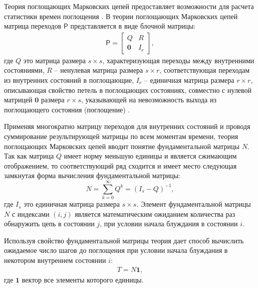 Теория поглощающих Марковских цепей предоставляет возможности для расчета статистики времен поглощения \cite{kemeny_finite_1976}. В теории поглощающих Марковских цепей матрица переходов $\mathsf{P}$ представляется в виде блочной матрицы:
\begin{equation}
    \begin{aligned}
    \mathsf{P}=
      \begin{bmatrix}
        Q & R \\
        \textbf{0} & I_r
      \end{bmatrix},
    \label{eq:P}
    \end{aligned}
\end{equation}
где $Q$ это матрица размера $s \times s$, характеризующая переходы между внутренними состояниями, 
$R$ -- ненулевая матрица размера $s \times r$, соответствующая переходам из внутренних состояний в поглощающие, $I_r$ -- единичная матрица размера $r \times r$, описывающая свойство петель в поглощающих состояниях, совместно с нулевой матрицей $\textbf{0}$ размера $r \times s$, указывающей на невозможность выхода из поглощающего состояния (поглощение) \cite{kemeny_finite_1976}.

Применяя многократно матрицу переходов для внутренних состояний и проводя суммирование результирующей матрицы по всем моментам времени, теория поглощающих Марковских цепей вводит понятие фундаментальной матрицы $N$. Так как матрица $Q$ имеет норму меньшую единицы и является сжимающим отображением, то соответствующий ряд сходится и имеет место следующая замкнутая форма вычисления фундаментальной матрицы:
\begin{equation}
    N=\sum_{k=0}^{\infty} Q^k=(I_s-Q)^{-1},
    \label{eq:N}
\end{equation}
где $I_s$ это единичная матрица размера $s \times s$. Элемент фундаментальной матрицы $N$ с индексами $(i, j)$ является математическим ожиданием количества раз обнаружить цепь в состоянии $j$, при условии начала блуждания в состоянии $i$.

Используя свойство фундаментальной матрицы теория дает способ вычислить ожидаемое число шагов до поглощения при условии начала блуждания в некотором внутреннем состоянии $i$:
\begin{equation}
    \begin{aligned}
    T=N\textbf{1},
    \label{eq:T}
    \end{aligned}
\end{equation}
где $\textbf{1}$ вектор все элементы которого единицы.

